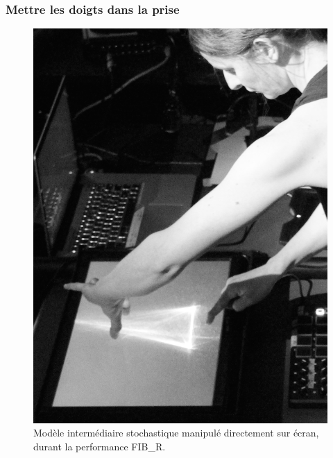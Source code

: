 \subsubsection{Mettre les doigts dans la prise}
\begin{figure}[!htbp]
	\captionsetup{format=plain}%
	\includegraphics[width=\textwidth]{gfx/06_visual_representation/Xypre-Live.jpg}
	\caption[Modèle intermédiaire stochastique manipulé sur écran]{Modèle intermédiaire stochastique manipulé directement sur écran, durant la performance FIB\_R.}
	\label{fig:visual_representation:xypre-live}
\end{figure}

